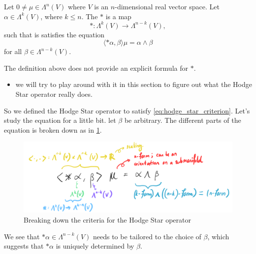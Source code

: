 \documentclass[notoc,notitlepage]{tufte-book}
\begin{document}
\begin{defn}\label{defn:hodge_star_operator}
  Let $0 \neq \mu \in \Lambda^n(V)$ where $V$ is an $n$-dimensional real vector
  space. Let $\alpha \in \Lambda^k(V)$, where $k \leq n$. The  $*$ is a map
  \begin{equation*}
    * : \Lambda^k(V) \to \Lambda^{n-k}(V),
  \end{equation*}
  such that is satisfies the equation
  \begin{equation}\label{eq:hodge_star_criterion}
    \langle * \alpha, \beta \rangle \mu = \alpha \land \beta
  \end{equation}
  for all $\beta \in \Lambda^{n-k}(V)$.
\end{defn}

\begin{note}
  The definition above does not provide an explicit formula for $*$.
  \begin{itemize}
    \item we will try to play around with it in this section to figure out
      what the Hodge Star operator really does.
  \end{itemize}
\end{note}

\begin{note}
  So we defined the Hodge Star operator to satisfy
  \cref{eq:hodge_star_criterion}. Let's study the equation for a little bit. let
  $\beta$ be arbitrary. The different parts of the equation is broken down as
  in \cref{fig:breaking_down_the_criteria_for_the_hodge_star_operator}.
  \begin{figure}[ht]
    \centering
    \includegraphics[width=\linewidth]{images/hodge-star-criterion-breakdown.png}
    \caption{Breaking down the criteria for the Hodge Star operator}
    \label{fig:breaking_down_the_criteria_for_the_hodge_star_operator}
  \end{figure}

  We see that $* \alpha \in \Lambda^{n-k}(V)$ needs to be tailored to the choice
  of $\beta$, which suggests that $* \alpha$ is uniquely determined by $\beta$.
\end{note}
\end{document}
